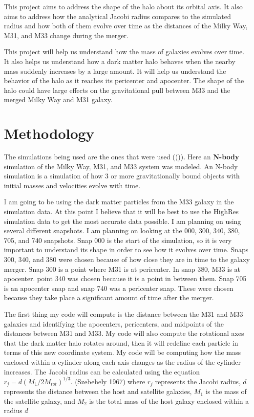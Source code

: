 \documentclass[fleqn,usenatbib]{mnras}
\begin{document}
        This project aims to address the shape of the halo about its orbital axis. It also aims to address how the analytical Jacobi radius compares to the simulated radius and how both of them evolve over time as the distances of the Milky Way, M31, and M33 change during the merger.


        This project will help us understand how the mass of galaxies evolves over time. It also helps us understand how a dark matter halo behaves when the nearby mass suddenly increases by a large amount. It will help us understand the behavior of the halo as it reaches its pericenter and apocenter. The shape of the halo could have large effects on the gravitational pull between M33 and the merged Milky Way and M31 galaxy.



\section{Methodology}
        The simulations being used are the ones that were used ((\citet{vanderMarel2012})). Here an \textbf{N-body} simulation of the Milky Way, M31, and M33 system was modeled. An N-body simulation is a simulation of how 3 or more gravitationally bound objects with initial masses and velocities evolve with time.

        I am going to be using the dark matter particles from the M33 galaxy in the simulation data. At this point I believe that it will be best to use the HighRes simulation data to get the most accurate data possible. I am planning on using several different snapshots. I am planning on looking at the 000, 300, 340, 380, 705, and 740 snapshots. Snap 000 is the start of the simulation, so it is very important to understand its shape in order to see how it evolves over time. Snaps 300, 340, and 380 were chosen because of how close they are in time to the galaxy merger. Snap 300 is a point where M31 is at pericenter. In snap 380, M33 is at apocenter. point 340 was chosen because it is a point in between them. Snap 705 is an apocenter snap and snap 740 was a pericenter snap. These were chosen because they take place a significant amount of time after the merger.


        The first thing my code will compute is the distance between the M31 and M33 galaxies and identifying the apocenters, pericenters, and midpoints of the distances between M31 and M33. My code will also compute the rotational axes that the dark matter halo rotates around, then it will redefine each particle in terms of this new coordinate system. My code will be computing how the mass enclosed within a cylinder along each axis changes as the radius of the cylinder increases. The Jacobi radius can be calculated using the equation $r_j = d(M_1/{2M_{tot}})^{1/3}$. (Szebehely 1967) where $r_j$ represents the Jacobi radius, $d$ represents the distance between the host and satellite galaxies, $M_1$ is the mass of the satellite galaxy, and $M_2$ is the total mass of the host galaxy enclosed within a radius $d$
\end{document}
